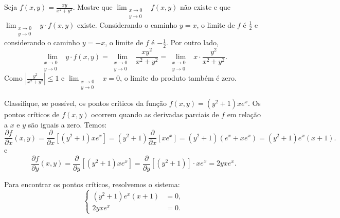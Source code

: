 \documentclass[12pt,a4paper]{article}
\begin{document}
\begin{ExerciseList}
\Exercise[title={2,5}] Seja $f(x, y) = \frac{x y}{x^2 + y^2}$. Mostre que $\displaystyle\lim_{\begin{smallmatrix} x \to 0 & \\ y \to 0 \end{smallmatrix}} f(x, y)$ não existe e que $\displaystyle\lim_{\begin{smallmatrix} x \to 0 & \\ y \to 0 \end{smallmatrix}} y \cdot f(x, y)$ existe.
\Answer Considerando o caminho $y=x$, o limite de $f$ é $\frac{1}{2}$ e considerando o caminho $y=-x$, o limite de $f$ é $-\frac{1}{2}$.
Por outro lado,
\[
\lim_{\begin{smallmatrix} x \to 0 & \\ y \to 0 \end{smallmatrix}} y \cdot f(x, y)
= \lim_{\begin{smallmatrix} x \to 0 & \\ y \to 0 \end{smallmatrix}} \frac{x y^2}{x^2 + y^2}
= \lim_{\begin{smallmatrix} x \to 0 & \\ y \to 0 \end{smallmatrix}} x \cdot \frac{y^2}{x^2 + y^2}.
\]
Como $\left|\frac{y^2}{x^2 + y^2}\right| \leq 1$ e $\lim_{\begin{smallmatrix} x \to 0 & \\ y \to 0 \end{smallmatrix}} x = 0$, o limite do produto também é zero.

\Exercise[title={2,5}] Classifique, se possível, os pontos críticos da função $f(x, y) = (y^2 + 1) x e^x$.
\Answer Os pontos críticos de $f(x, y)$ ocorrem quando as derivadas parciais de $f$ em relação a $x$ e $y$ são iguais a zero. Temos:
\[
\frac{\partial f}{\partial x}(x, y)
= \frac{\partial}{\partial x} \left[(y^2 + 1)x e^x \right]
= (y^2 + 1) \frac{\partial}{\partial x} \left[x e^x \right]
= (y^2 + 1)\left(e^x + x e^x\right)
= (y^2 + 1)e^x(x + 1).
\]
e
\[
\frac{\partial f}{\partial y}(x, y)
= \frac{\partial}{\partial y} \left[(y^2 + 1)x e^x \right]
= \frac{\partial}{\partial y} \left[(y^2 + 1)\right] \cdot x e^x
= 2y x e^x.
\]

Para encontrar os pontos críticos, resolvemos o sistema:
\[
\begin{cases}
    (y^2 + 1)e^x(x + 1) &= 0,\\
    2y x e^x & = 0.
\end{cases}
\]


\end{ExerciseList}
\end{document}
